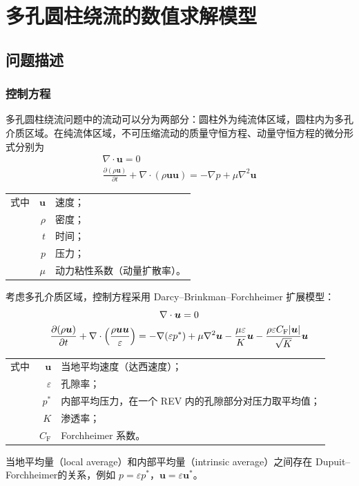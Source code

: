 \chapter{多孔圆柱绕流的数值求解模型}

\section{问题描述}

\subsection{控制方程} %

多孔圆柱绕流问题中的流动可以分为两部分：圆柱外为纯流体区域，圆柱内为多孔介质区域。在纯流体区域，不可压缩流动的质量守恒方程、动量守恒方程的微分形式分别为
\begin{gather}
	\nabla \cdot \bm{u} = 0 \\
	\frac{\partial(\rho\bm{u})}{\partial t} + \nabla \cdot (\rho\bm{u}\bm{u}) = -\nabla p + \mu\nabla^2\bm{u}
\end{gather}
\begin{tabularx}{\textwidth}{@{}l@{\quad}r@{——}X@{}}
	式中 & $\bm{u}$ & 速度；\\
		& $\rho$ & 密度；\\
		& $t$ & 时间；\\
		& $p$ & 压力；\\
		& $\mu$ & 动力粘性系数（动量扩散率）。
\end{tabularx}\vspace{3.15bp}


考虑多孔介质区域，控制方程采用 Darcy–Brinkman–Forchheimer 扩展模型：
\begin{gather}
	\nabla \cdot \bm{u} = 0 \\
	\frac{\partial(\rho\bm{u})}{\partial t} + 
	\nabla \cdot \left(\frac{\rho\bm{u}\bm{u}}{\varepsilon}\right) = 
	-\nabla (\varepsilon p^*) + \mu\nabla^2\bm{u} - 
	\frac{\mu\varepsilon}{K}\bm{u} - 
	\frac{\rho\varepsilon C_{\mathrm{F}}\lvert\bm{u}\vert}{\sqrt K}\bm{u}
\end{gather}
\begin{tabularx}{\textwidth}{@{}l@{\quad}r@{——}X@{}}
	式中 & $\bm{u}$ & 当地平均速度（达西速度）；\\
		& $\varepsilon$ & 孔隙率；\\
		& $p^*$ & 内部平均压力，在一个 REV 内的孔隙部分对压力取平均值；\\
		& $K$ & 渗透率；\\
		& $C_{\mathrm{F}}$ & Forchheimer 系数。
\end{tabularx}\vspace{3.15bp}
当地平均量（local average）和内部平均量（intrinsic average）之间存在 Dupuit–Forchheimer的关系，例如 $p=\varepsilon p^*$，$\bm{u}=\varepsilon \bm{u}^*$。

